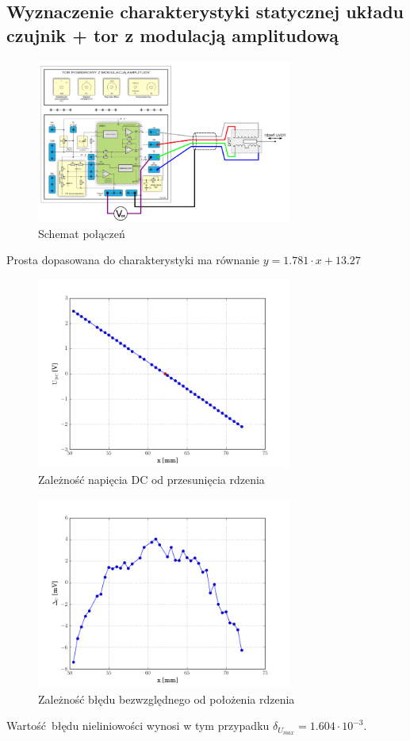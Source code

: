 \documentclass[a4paper, 12pt, titlepage]{article}
\begin{document}
		\subsection{Wyznaczenie charakterystyki statycznej układu czujnik + tor z modulacją amplitudową}
			\begin{figure}[H]
				\centering
				\includegraphics[width=0.75\textwidth]{./img/trzecie_tor.png}
				\caption{\small{Schemat połączeń}}
			\end{figure} \noindent
			Prosta dopasowana do charakterystyki ma równanie $y = 1.781 \cdot x + 13.27$
			\begin{figure}[H]
				\centering
				\includegraphics[width=0.75\textwidth]{./img/Udc_od_x.png}
				\caption{\small{Zależność napięcia DC od przesunięcia rdzenia}}
			\end{figure} \noindent
			\begin{figure}[H]
				\centering
				\includegraphics[width=0.75\textwidth]{./img/Udc_blad.png}
				\caption{\small{Zależność błędu bezwzględnego od położenia rdzenia}}
			\end{figure} \noindent
			Wartość błędu nieliniowości wynosi w tym przypadku $\delta_{U_{max}} = 1.604 \cdot 10^{-3}$.
\end{document}
